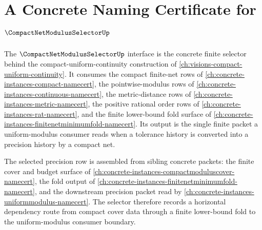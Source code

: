 \chapter{A Concrete Naming Certificate for $\CompactNetModulusSelectorUp$}
\label{ch:concrete-instances-compactnetmodulusselector-namecert}

The $\CompactNetModulusSelectorUp$ interface is the concrete finite selector behind the compact-uniform-continuity construction of \autoref{ch:visions-compact-uniform-continuity}. It consumes the compact finite-net rows of \autoref{ch:concrete-instances-compact-namecert}, the pointwise-modulus rows of \autoref{ch:concrete-instances-continuous-namecert}, the metric-distance rows of \autoref{ch:concrete-instances-metric-namecert}, the positive rational order rows of \autoref{ch:concrete-instances-rat-namecert}, and the finite lower-bound fold surface of \autoref{ch:concrete-instances-finitenetminimumfold-namecert}. Its output is the single finite packet a uniform-modulus consumer reads when a tolerance history is converted into a precision history by a compact net.

The selected precision row is assembled from sibling concrete packets: the finite cover and budget surface of \autoref{ch:concrete-instances-compactmoduluscover-namecert}, the fold output of \autoref{ch:concrete-instances-finitenetminimumfold-namecert}, and the downstream precision packet read by \autoref{ch:concrete-instances-uniformmodulus-namecert}. The selector therefore records a horizontal dependency route from compact cover data through a finite lower-bound fold to the uniform-modulus consumer boundary.

